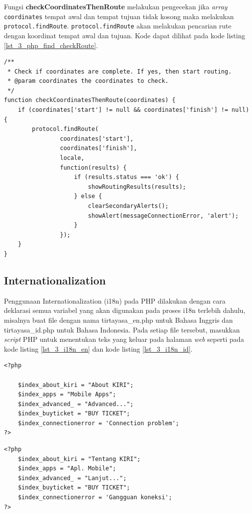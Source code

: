 Fungsi \textbf{checkCoordinatesThenRoute} melakukan pengecekan jika \textit{array} \verb!coordinates! tempat awal dan tempat tujuan tidak kosong maka melakukan \verb!protocol.findRoute!. \verb!protocol.findRoute! akan melakukan pencarian rute dengan koordinat tempat awal dan tujuan. Kode dapat dilihat pada kode listing \ref{lst_3_php_find_checkRoute}.
\begin{lstlisting}[caption=Fungsi JavaScript checkCoordinatesThenRoute,label = {lst_3_php_find_checkRoute}]
/**
 * Check if coordinates are complete. If yes, then start routing.
 * @param coordinates the coordinates to check.
 */
function checkCoordinatesThenRoute(coordinates) {
	if (coordinates['start'] != null && coordinates['finish'] != null) {
		protocol.findRoute(
				coordinates['start'],
				coordinates['finish'],
				locale,
				function(results) {
					if (results.status === 'ok') {
						showRoutingResults(results);
					} else {
						clearSecondaryAlerts();
						showAlert(messageConnectionError, 'alert');
					}
				});
	}
}
\end{lstlisting}

\subsection{Internationalization}
Penggunaan Internationalization (i18n) pada PHP dilakukan dengan cara deklarasi semua variabel yang akan digunakan pada proses i18n terlebih dahulu, misalnya buat file dengan nama tirtayasa\_en.php untuk Bahasa Inggris dan tirtayasa\_id.php untuk Bahasa Indonesia. Pada setiap file tersebut, masukkan \textit{script} PHP untuk menentukan teks yang keluar pada halaman \textit{web} seperti pada kode listing \ref{lst_3_i18n_en} dan kode listing \ref{lst_3_i18n_id}. 

\begin{lstlisting}[caption=Script PHP untuk Bahasa Inggris,label = {lst_3_i18n_en}]
<?php

	$index_about_kiri = "About KIRI";
	$index_apps = "Mobile Apps";
	$index_advanced_ = "Advanced...";
	$index_buyticket = "BUY TICKET";
	$index_connectionerror = 'Connection problem';
?>
\end{lstlisting}


\begin{lstlisting}[caption=Script PHP untuk Bahasa Indonesia,label = {lst_3_i18n_id}]
<?php
	$index_about_kiri = "Tentang KIRI";
	$index_apps = "Apl. Mobile";
	$index_advanced_ = "Lanjut...";
	$index_buyticket = "BUY TICKET";
	$index_connectionerror = 'Gangguan koneksi';
?>
\end{lstlisting}

